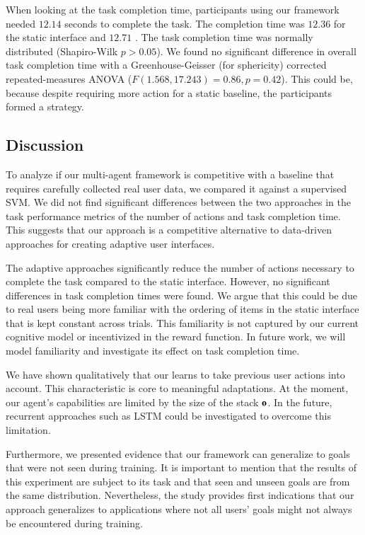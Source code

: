 When looking at the task completion time, participants using our framework needed $12.14$ seconds to complete the task. The completion time was $12.36$ for the static interface and $12.71$ . The task completion time was normally distributed (Shapiro-Wilk $p>0.05$). We found no significant difference in overall task completion time with a Greenhouse-Geisser (for sphericity) corrected repeated-measures ANOVA ($F(1.568, 17.243)=0.86, p=0.42$). This could be, because despite requiring more action for a static baseline, the participants formed a strategy.

\subsection{Discussion}
To analyze if our multi-agent framework is competitive with a baseline that requires carefully collected real user data, we compared it against a supervised SVM. We did not find significant differences between the two approaches in the task performance metrics of the number of actions and task completion time. This suggests that our approach is a competitive alternative to data-driven approaches for creating adaptive user interfaces. 

The adaptive approaches significantly reduce the number of actions necessary to complete the task compared to the static interface. However, no significant differences in task completion times were found. We argue that this could be due to real users being more familiar with the ordering of items in the static interface that is kept constant across trials. This familiarity is not captured by our current cognitive model or incentivized in the reward function. In future work, we will model familiarity and investigate its effect on task completion time. 

We have shown qualitatively that our \interfaceagent learns to take previous user actions into account. This characteristic is core to meaningful adaptations. At the moment, our agent's capabilities are limited by the size of the stack $\mathbf{o}$. In the future, recurrent approaches such as LSTM could be investigated to overcome this limitation. 

Furthermore, we presented evidence that our framework can generalize to goals that were not seen during training. 
It is important to mention that the results of this experiment are subject to its task and that seen and unseen goals are from the same distribution. Nevertheless, the study provides first indications that our approach generalizes to applications where not all users' goals might not always be encountered during training.